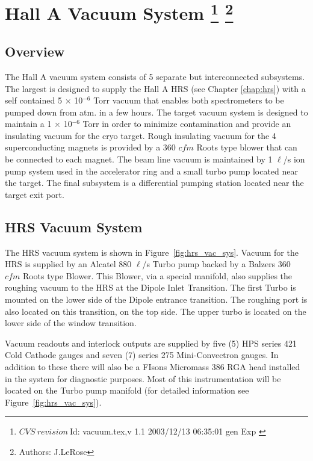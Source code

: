 \chapter[Hall A Vacuum System]{Hall A Vacuum System
\footnote{
  $CVS~revision~ $Id: vacuum.tex,v 1.1 2003/12/13 06:35:01 gen Exp $ $ 
}
\footnote{Authors: J.LeRose }
}
\label{chap:vacuum}
\section{Overview}

The Hall A vacuum system consists of 5 separate but interconnected 
subsystems.  The largest is designed to supply 
the Hall A HRS (see Chapter \ref{chap:hrs}) with a 
self contained 5 $\times$ 10$^{-6}$ Torr vacuum that enables both 
spectrometers to be pumped down from atm. in a few hours.  The target 
vacuum system is designed to maintain a 1 $\times$ 10$^{-6}$ Torr in 
order to minimize contamination and provide an insulating vacuum for the 
cryo target.  Rough insulating vacuum for the 4 superconducting magnets 
is provided by a 360 $cfm$ Roots type blower that can be connected to each 
magnet.  The beam line vacuum is maintained by 1 $\ell$/s ion pump 
system used in the accelerator ring and a small turbo pump located near 
the target.  The final subsystem is a differential pumping station 
located near the target exit port.

\section{HRS Vacuum System}

The HRS vacuum system is shown in Figure~\ref{fig:hrs_vac_sys}.
Vacuum for the HRS is supplied by an Alcatel 880 $\ell$/s Turbo 
pump backed by a Balzers 360 $cfm$ Roots type Blower.  This Blower, via a 
special manifold, also supplies the roughing vacuum to the HRS at the 
Dipole Inlet Transition.  The first Turbo is mounted on the lower side 
of the Dipole entrance transition.  The roughing port is also located on 
this transition, on the top side.  The upper turbo is located on the 
lower side of the window transition.

Vacuum readouts and interlock outputs are supplied by five (5) HPS 
series 421 Cold Cathode gauges and seven (7) series 275 Mini-Convectron 
gauges.  In addition to these there will also be a FIsons Micromass 386 
RGA head installed in the system for diagnostic purposes.  Most of this 
instrumentation will be located on the Turbo pump manifold (for detailed 
information see Figure~\ref{fig:hrs_vac_sys}).

